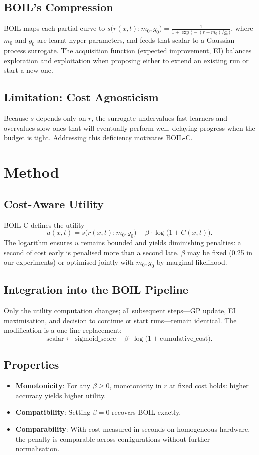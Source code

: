 \documentclass{article} %
\begin{document}
\subsection{BOIL's Compression}
BOIL maps each partial curve to \(s\big(r(x,t); m_0, g_0\big) = \frac{1}{1 + \exp\big(- (r - m_0)/g_0\big)}\), where \(m_0\) and \(g_0\) are learnt hyper-parameters, and feeds that scalar to a Gaussian-process surrogate. The acquisition function (expected improvement, EI) balances exploration and exploitation when proposing either to extend an existing run or start a new one.

\subsection{Limitation: Cost Agnosticism}
Because \(s\) depends only on \(r\), the surrogate undervalues fast learners and overvalues slow ones that will eventually perform well, delaying progress when the budget is tight. Addressing this deficiency motivates BOIL-C.

\section{Method}
\label{sec:method}%
%
\subsection{Cost-Aware Utility}
BOIL-C defines the utility
\[
  u(x,t) = s\big(r(x,t); m_0, g_0\big) - \beta\cdot \log\big(1 + C(x,t)\big).
\]
The logarithm ensures \(u\) remains bounded and yields diminishing penalties: a second of cost early is penalised more than a second late. \(\beta\) may be fixed (0.25 in our experiments) or optimised jointly with \(m_0, g_0\) by marginal likelihood.

\subsection{Integration into the BOIL Pipeline}
Only the utility computation changes; all subsequent steps---GP update, EI maximisation, and decision to continue or start runs---remain identical. The modification is a one-line replacement:
\[
  \text{scalar} \leftarrow \text{sigmoid\_score} - \beta\cdot \log\big(1 + \text{cumulative\_cost}\big).
\]

\subsection{Properties}
\begin{itemize}
  \item \textbf{Monotonicity}: For any \(\beta \ge 0\), monotonicity in \(r\) at fixed cost holds: higher accuracy yields higher utility.
  \item \textbf{Compatibility}: Setting \(\beta=0\) recovers BOIL exactly.
  \item \textbf{Comparability}: With cost measured in seconds on homogeneous hardware, the penalty is comparable across configurations without further normalisation.
\end{itemize}
\end{document}

